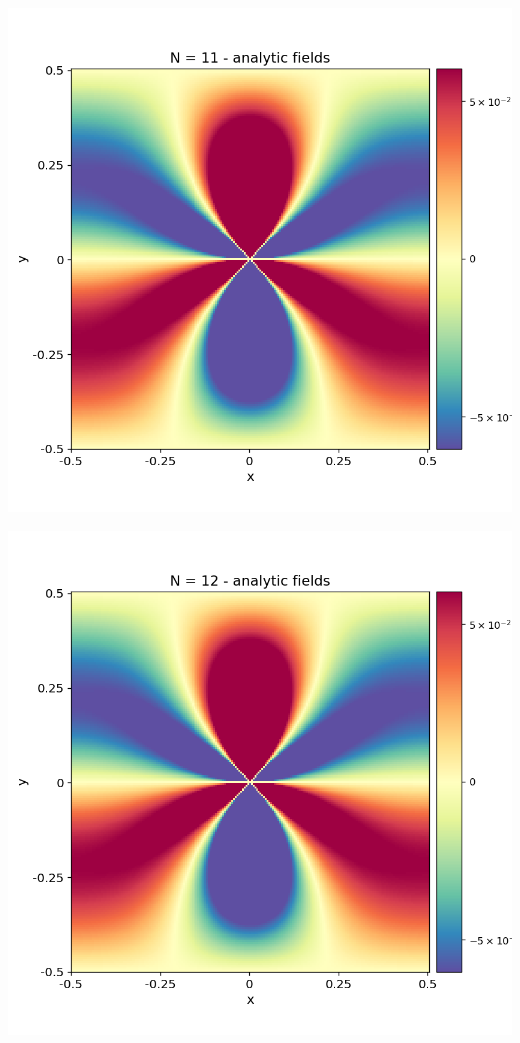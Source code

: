 \documentclass[12pt,a4paper]{article}
\theoremstyle{plain}
\begin{document}
\begin{multicols*}{2}
\begin{minipage}{0.22\columnwidth}
	\end{minipage}
	\begin{minipage}{0.22\columnwidth}
		\centering
		\includegraphics[width=\columnwidth]{./stress_field_11.png}
	\end{minipage}
	\begin{minipage}{0.22\columnwidth}
		\centering
		\includegraphics[width=\columnwidth]{./stress_field_12.png}
	\end{minipage}


\end{multicols*}
\end{document}
